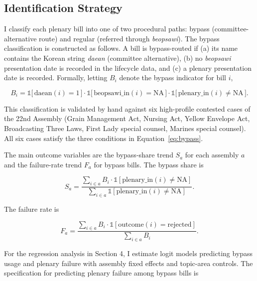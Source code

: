 \documentclass[11pt]{article}
\begin{document}
\subsection{Identification Strategy}

I classify each plenary bill into one of two procedural paths: bypass (committee-alternative route) and regular (referred through \textit{beopsawi}). The bypass classification is constructed as follows. A bill is bypass-routed if (a) its name contains the Korean string \textit{daean} (committee alternative), (b) no \textit{beopsawi} presentation date is recorded in the lifecycle data, and (c) a plenary presentation date is recorded. Formally, letting $B_i$ denote the bypass indicator for bill $i$,

\begin{equation}
B_i = \mathbb{1}\big[\,\text{daean}(i) = 1\,\big] \cdot \mathbb{1}\big[\,\text{beopsawi\_in}(i) = \text{NA}\,\big] \cdot \mathbb{1}\big[\,\text{plenary\_in}(i) \neq \text{NA}\,\big].
\label{eq:bypass}
\end{equation}

This classification is validated by hand against six high-profile contested cases of the 22nd Assembly (Grain Management Act, Nursing Act, Yellow Envelope Act, Broadcasting Three Laws, First Lady special counsel, Marines special counsel). All six cases satisfy the three conditions in Equation~\ref{eq:bypass}.

The main outcome variables are the bypass-share trend $S_a$ for each assembly $a$ and the failure-rate trend $F_a$ for bypass bills. The bypass share is

\begin{equation}
S_a = \frac{\sum_{i \in a} B_i \cdot \mathbb{1}[\text{plenary\_in}(i) \neq \text{NA}]}{\sum_{i \in a} \mathbb{1}[\text{plenary\_in}(i) \neq \text{NA}]}.
\label{eq:share}
\end{equation}

The failure rate is

\begin{equation}
F_a = \frac{\sum_{i \in a} B_i \cdot \mathbb{1}[\text{outcome}(i) = \text{rejected}]}{\sum_{i \in a} B_i}.
\label{eq:fail}
\end{equation}

For the regression analysis in Section 4, I estimate logit models predicting bypass usage and plenary failure with assembly fixed effects and topic-area controls. The specification for predicting plenary failure among bypass bills is
\end{document}
